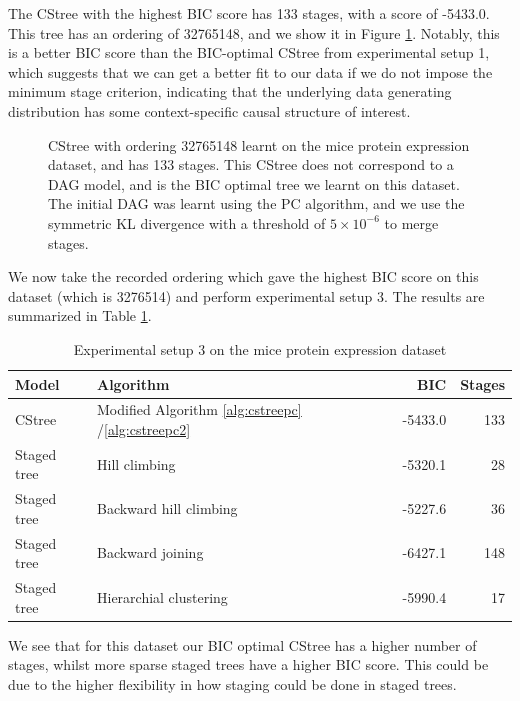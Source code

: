 \documentclass{tufte-book}
\begin{document}
The CStree with the highest BIC score has 133 stages, with a score of -5433.0. This tree has an ordering of 32765148, and we show it in Figure \ref{fig:micemaxbic}. Notably, this is a better BIC score than the BIC-optimal CStree from experimental setup 1, which suggests that we can get a better fit to our data if we do not impose the minimum stage criterion, indicating that the underlying data generating distribution has some context-specific causal structure of interest.


\begin{figure}[!h]\label{fig:micemaxbic}
   \begin{floatrow}
%
\caption{CStree with ordering 32765148 learnt on the mice protein expression dataset, and has 133 stages. This CStree does not correspond to a DAG model, and is the BIC optimal tree we learnt on this dataset. The initial DAG was learnt using the PC algorithm, and we use the symmetric KL divergence with a threshold of $5\times 10^{-6}$ to merge stages.}
        
   \end{floatrow}
\end{figure}

We now take the recorded ordering which gave the highest BIC score on this dataset (which is 3276514) and perform experimental setup 3. The results are summarized in Table \ref{tab:org556cc4e}.

\begin{table}[htbp]
\caption{\label{tab:org556cc4e}Experimental setup 3 on the mice protein expression dataset}
\centering
\begin{tabular}{l|l|r|r}
\hline
Model & Algorithm & BIC & Stages\\
\hline
CStree & Modified Algorithm \ref{alg:cstreepc} /\ref{alg:cstreepc2} & -5433.0 & 133\\
Staged tree & Hill climbing & -5320.1 & 28\\
Staged tree & Backward hill climbing & -5227.6 & 36\\
Staged tree & Backward joining & -6427.1 & 148\\
Staged tree & Hierarchial clustering & -5990.4 & 17\\
\end{tabular}
\end{table}

We see that for this dataset our BIC optimal CStree has a higher number of stages, whilst more sparse staged trees have a higher BIC score. This could be due to the higher flexibility in how staging could be done in staged trees.
\end{document}
